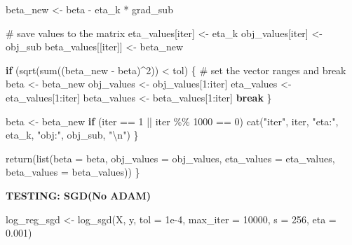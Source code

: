 \documentclass[
  letterpaper,
  DIV=11,
  numbers=noendperiod]{scrartcl}
\newenvironment{Shaded}{\begin{snugshade}}{\end{snugshade}}
\newcommand{\AttributeTok}[1]{\textcolor[rgb]{0.40,0.45,0.13}{#1}}
\newcommand{\CommentTok}[1]{\textcolor[rgb]{0.37,0.37,0.37}{#1}}
\newcommand{\ControlFlowTok}[1]{\textcolor[rgb]{0.00,0.23,0.31}{\textbf{#1}}}
\newcommand{\DecValTok}[1]{\textcolor[rgb]{0.68,0.00,0.00}{#1}}
\newcommand{\FloatTok}[1]{\textcolor[rgb]{0.68,0.00,0.00}{#1}}
\newcommand{\FunctionTok}[1]{\textcolor[rgb]{0.28,0.35,0.67}{#1}}
\newcommand{\NormalTok}[1]{\textcolor[rgb]{0.00,0.23,0.31}{#1}}
\newcommand{\OtherTok}[1]{\textcolor[rgb]{0.00,0.23,0.31}{#1}}
\newcommand{\SpecialCharTok}[1]{\textcolor[rgb]{0.37,0.37,0.37}{#1}}
\newcommand{\StringTok}[1]{\textcolor[rgb]{0.13,0.47,0.30}{#1}}
\begin{document}
\begin{Shaded}
\begin{Highlighting}[]
\NormalTok{    beta\_new }\OtherTok{\textless{}{-}}\NormalTok{ beta }\SpecialCharTok{{-}}\NormalTok{ eta\_k }\SpecialCharTok{*}\NormalTok{ grad\_sub}
    
    \CommentTok{\# save values to the matrix}
\NormalTok{    eta\_values[iter] }\OtherTok{\textless{}{-}}\NormalTok{ eta\_k}
\NormalTok{    obj\_values[iter] }\OtherTok{\textless{}{-}}\NormalTok{ obj\_sub}
\NormalTok{    beta\_values[[iter]] }\OtherTok{\textless{}{-}}\NormalTok{ beta\_new}
    
    \ControlFlowTok{if}\NormalTok{ (}\FunctionTok{sqrt}\NormalTok{(}\FunctionTok{sum}\NormalTok{((beta\_new }\SpecialCharTok{{-}}\NormalTok{ beta)}\SpecialCharTok{\^{}}\DecValTok{2}\NormalTok{)) }\SpecialCharTok{\textless{}}\NormalTok{ tol) \{}
      \CommentTok{\# set the vector ranges and break}
\NormalTok{      beta }\OtherTok{\textless{}{-}}\NormalTok{ beta\_new}
\NormalTok{      obj\_values }\OtherTok{\textless{}{-}}\NormalTok{ obj\_values[}\DecValTok{1}\SpecialCharTok{:}\NormalTok{iter]}
\NormalTok{      eta\_values }\OtherTok{\textless{}{-}}\NormalTok{ eta\_values[}\DecValTok{1}\SpecialCharTok{:}\NormalTok{iter]}
\NormalTok{      beta\_values }\OtherTok{\textless{}{-}}\NormalTok{ beta\_values[}\DecValTok{1}\SpecialCharTok{:}\NormalTok{iter]}
      \ControlFlowTok{break}
\NormalTok{    \}}
    
\NormalTok{    beta }\OtherTok{\textless{}{-}}\NormalTok{ beta\_new}
    \ControlFlowTok{if}\NormalTok{ (iter }\SpecialCharTok{==} \DecValTok{1} \SpecialCharTok{||}\NormalTok{ iter }\SpecialCharTok{\%\%} \DecValTok{1000} \SpecialCharTok{==} \DecValTok{0}\NormalTok{) }\FunctionTok{cat}\NormalTok{(}\StringTok{"iter"}\NormalTok{, iter, }\StringTok{"eta:"}\NormalTok{, eta\_k, }\StringTok{"obj:"}\NormalTok{, obj\_sub, }\StringTok{"}\SpecialCharTok{\textbackslash{}n}\StringTok{"}\NormalTok{)}
\NormalTok{  \}}
  
  \FunctionTok{return}\NormalTok{(}\FunctionTok{list}\NormalTok{(}\AttributeTok{beta =}\NormalTok{ beta, }\AttributeTok{obj\_values =}\NormalTok{ obj\_values, }\AttributeTok{eta\_values =}\NormalTok{ eta\_values, }\AttributeTok{beta\_values =}\NormalTok{ beta\_values))}
\NormalTok{\}}
\end{Highlighting}
\end{Shaded}

\textbf{TESTING: SGD(No ADAM)}

\begin{Shaded}
\begin{Highlighting}[]
\NormalTok{log\_reg\_sgd }\OtherTok{\textless{}{-}} \FunctionTok{log\_sgd}\NormalTok{(X, y, }\AttributeTok{tol =} \FloatTok{1e{-}4}\NormalTok{, }\AttributeTok{max\_iter =} \DecValTok{10000}\NormalTok{, }\AttributeTok{s =} \DecValTok{256}\NormalTok{, }\AttributeTok{eta =} \FloatTok{0.001}\NormalTok{)}
\end{Highlighting}
\end{Shaded}
\end{document}
